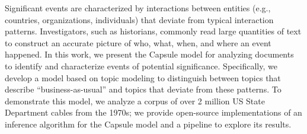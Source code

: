 
Significant events are characterized by interactions between entities (e.g., countries, organizations, individuals) that deviate from typical interaction patterns.  Investigators, such as historians, commonly read large quantities of text to construct an accurate picture of who, what, when, and where an event happened.  In this work, we present the Capsule model for analyzing documents to identify and characterize events of potential significance.
Specifically, we develop a model based on topic modeling to distinguish between topics that describe ``business-as-usual'' and topics that deviate from these patterns.
To demonstrate this model, we analyze a corpus of over 2 million US State Department cables from the 1970s; we provide open-source implementations of an inference algorithm for the Capsule model and a pipeline to explore its results.